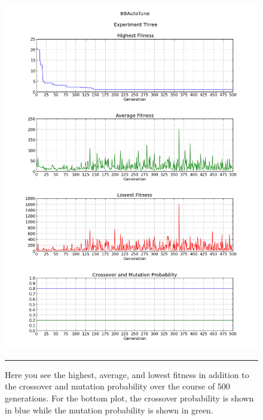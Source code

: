 \begin{figure}[htbp]
\centering
\includegraphics[width=5in]{../Figures/Chapter4/exp3_halcm.png}
\rule{35em}{0.5pt}
\caption[Experiment Three GA Metrics]{Here you see the highest, average, and lowest fitness in addition to the crossover and mutation probability over the course of 500 generations. For the bottom plot, the crossover probability is shown in blue while the mutation probability is shown in green.}
\label{fig:exp3_halcm}
\end{figure}

